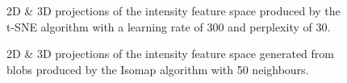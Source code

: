 \clearpage
\begin{figure}[H]
	\centering
	\caption{2D \& 3D projections of the intensity feature space produced by the t-SNE algorithm with a learning rate of 300 and perplexity of 30.}\label{fig:intensity_SNE_mapping}
\end{figure}

\begin{figure}[H]
	\centering
	\caption{2D \& 3D projections of the intensity feature space generated from blobs produced by the Isomap algorithm with 50 neighbours.}\label{fig:intensity_iso_mapping}
\end{figure}

